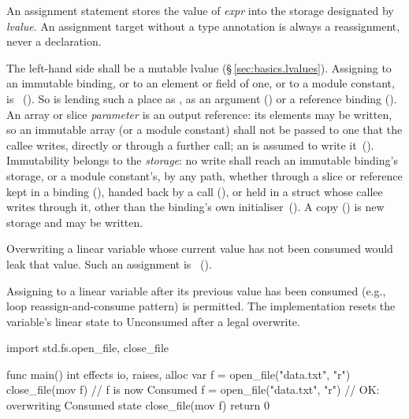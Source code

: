 \pnum
An assignment statement  stores the value of
\textit{expr} into the storage designated by \textit{lvalue}.
An assignment target without a type annotation is always a reassignment,
never a declaration.

\begin{constraint}
  The left-hand side shall be a mutable lvalue (\S\,\ref{sec:basics.lvalues}).
  Assigning to an immutable binding, or to an element or field of one, or to a module
  constant, is \illformed{}~().  So is lending such a place as ,
  as an argument () or a reference binding ().  An
  array or slice \emph{parameter} is an output reference: its elements may be written, so an
  immutable array (or a module constant) shall not be passed to one that the callee writes,
  directly or through a further call; an  is assumed to write it~().
  Immutability belongs to the \emph{storage}: no write shall reach an immutable binding's
  storage, or a module constant's, by any path, whether through a slice or reference kept in a
   binding (), handed back by a call
  (), or held in a struct whose callee writes through it, other than the
  binding's own initialiser~(). A copy () is new storage and
  may be written.
\end{constraint}

\begin{constraint}
  Overwriting a linear variable whose current value has not been consumed
  would leak that value.  Such an assignment is
  \illformed{}~().
\end{constraint}

\begin{note}
  Assigning to a linear variable after its previous value has been consumed
  (e.g., loop reassign-and-consume pattern) is permitted.  The implementation
  resets the variable's linear state to Unconsumed after a legal overwrite.
\end{note}

\begin{example}
\begin{laincode}
import std.fs.{open_file, close_file}

func main() int effects io, raises, alloc {
    var f = open_file("data.txt", "r")
    close_file(mov f)               // f is now Consumed
    f = open_file("data.txt", "r")  // OK: overwriting Consumed state
    close_file(mov f)
    return 0
}
\end{laincode}
\end{example}

